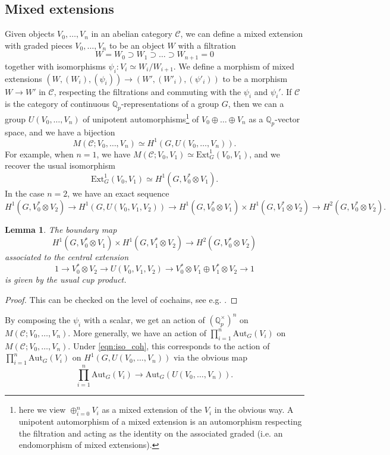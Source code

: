 \documentclass[11pt]{amsart}
\def\Q{\mathbb Q}
\newcommand{\Ext}{\mathrm{Ext}}
\def\Aut{\mathrm{Aut}}
\theoremstyle{plain}
\newtheorem{lemma}{Lemma}
\theoremstyle{definition}
\begin{document}
\subsection{Mixed extensions}\label{sec:me}
Given objects $V_0 ,\ldots ,V_n$ in an abelian category $\mathcal{C}$, we can define a mixed extension with graded pieces $V_0 ,\ldots ,V_n$ to be an object $W$ with a filtration
\[
W=W_0 \supset W_1 \supset \ldots \supset W_{n+1} =0
\]
together with isomorphisms $\psi _i :V_i \simeq W_{i}/W_{i+1}$. We define a morphism of mixed extensions $(W,(W_i ),(\psi _i ))\to (W',(W'_i ),(\psi ' _i ))$ to be a morphism $W\to W'$ in $\mathcal{C}$, respecting the filtrations and commuting with the $\psi _i$ and $\psi _i '$. If $\mathcal{C}$ is the category of continuous $\Q _p$-representations of a group $G$, then we can a group $U(V_0 ,\ldots ,V_n )$ of unipotent automorphisms\footnote{here we view $\oplus _{i=0}^n V_i$ as a mixed extension of the $V_i$ in the obvious way. A unipotent automorphism of a mixed extension is an automorphism respecting the filtration and acting as the identity on the associated graded (i.e. an endomorphism of mixed extensions).} of $V_0 \oplus \ldots \oplus V_n $ as a $\Q _p $-vector space, and we have a bijection
\begin{equation}\label{eqn:iso_coh}
M(\mathcal{C};V_0 ,\ldots ,V_n )\simeq H^1 (G,U(V_0 ,\ldots ,V_n )).
\end{equation}
For example, when $n=1$, we have $M(\mathcal{C};V_0 ,V_1 )\simeq \Ext ^1 _G (V_0 ,V_1 )$, and we recover the usual isomorphism
\[
\Ext ^1 _G (V_0 ,V_1 )\simeq H^1 (G,V_0 ^* \otimes V_1 ).
\]
In the case $n=2$, we have an exact sequence
\begin{equation}\label{eqn:ES}
H^1 (G,V_0 ^* \otimes V_2 )\to H^1 (G,U(V_0 ,V_1 ,V_2 ))\to H^1 (G,V_0 ^* \otimes V_1 )\times H^1 (G,V_1 ^* \otimes V_2 )\to H^2 (G,V_0 ^* \otimes V_2 ).
\end{equation}
\begin{lemma}
The boundary map
\[
H^1 (G,V_0 ^* \otimes V_1 )\times  H^1 (G,V_1 ^* \otimes V_2 )\to H^2 (G,V_0 ^* \otimes V_2 )
\]
associated to the central extension
\[
1\to V_0 ^* \otimes V_2 \to U(V_0 ,V_1 ,V_2 )\to V_0 ^* \otimes V_1 \oplus V_1 ^* \otimes V_2 \to 1
\]
is given by the usual cup product. 
\end{lemma}
\begin{proof}
This can be checked on the level of cochains, see e.g. \cite[Lemma 20]{dogra2023}.
\end{proof}

By composing the $\psi _i$ with a scalar, we get an action of $(\Q _p ^\times )^n $ on $M(\mathcal{C};V_0 ,\ldots ,V_n )$. More generally, we have an action of $\prod _{i=1}^n \Aut _G (V_i )$ on $M(\mathcal{C};V_0 ,\ldots ,V_n )$. Under \eqref{eqn:iso_coh}, this corresponds to the action of $\prod _{i=1}^n \Aut _G (V_i )$ on $H^1 (G,U(V_0 ,\ldots ,V_n ))$ via the obvious map
\[
\prod _{i=1}^n \Aut _G (V_i )\to \Aut _G (U(V_0 ,\ldots ,V_n )).
\]
\end{document}

